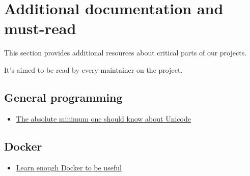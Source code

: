 \chapter{Additional documentation and must-read}
\label{chapter:must-read}

This section provides additional resources about critical parts of our projects.

It's aimed to be read by every maintainer on the project.

\section{General programming}

\begin{itemize}
    \item \href{https://www.joelonsoftware.com/2003/10/08/the-absolute-minimum-every-software-developer-absolutely-positively-must-know-about-unicode-and-character-sets-no-excuses/}{The absolute minimum one should know about Unicode}
\end{itemize}

\section{Docker}

\begin{itemize}
    \item \href{https://towardsdatascience.com/learn-enough-docker-to-be-useful-b7ba70caeb4b}{Learn enough Docker to be useful}
\end{itemize}
